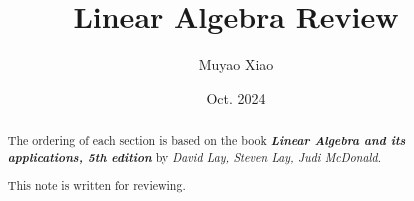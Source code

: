 \documentclass[a4paper]{report}
\title{Linear Algebra Review}
\author{Muyao Xiao}
\date{Oct. 2024}
\begin{document}
\maketitle

\begin{abstract}
    The ordering of each section is based on the book \textbf{\textit{Linear Algebra and its applications, 5th edition}} by  \textit{David Lay, Steven Lay, Judi McDonald}.
    \par 
    This note is written for reviewing.
\end{abstract}

\tableofcontents

% 
% 
% 
% 
% 

\pagestyle{plain}
\printbibliography{}
\end{document}
